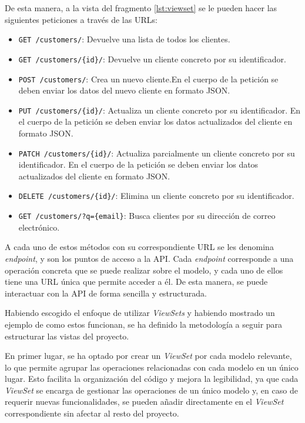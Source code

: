 De esta manera, a la vista del fragmento \ref{lst:viewset} se le pueden hacer las siguientes peticiones a través de las URLs:

\begin{itemize}
    \item \texttt{GET /customers/}: Devuelve una lista de todos los clientes.
    \item \texttt{GET /customers/\{id\}/}: Devuelve un cliente concreto por su identificador.
    \item \texttt{POST /customers/}: Crea un nuevo cliente.En el cuerpo de la petición se deben enviar los datos del nuevo cliente en formato JSON.
    \item \texttt{PUT /customers/\{id\}/}: Actualiza un cliente concreto por su identificador. En el cuerpo de la petición se deben enviar los datos actualizados del cliente en formato JSON.
    \item \texttt{PATCH /customers/\{id\}/}: Actualiza parcialmente un cliente concreto por su identificador. En el cuerpo de la petición se deben enviar los datos actualizados del cliente en formato JSON.
    \item \texttt{DELETE /customers/\{id\}/}: Elimina un cliente concreto por su identificador.
    \item \texttt{GET /customers/?q=\{email\}}: Busca clientes por su dirección de correo electrónico.
\end{itemize}

A cada uno de estos métodos con su correspondiente URL se les denomina \textit{endpoint}, y son los puntos de acceso a la API. Cada \textit{endpoint} corresponde a una operación concreta que se puede realizar sobre el modelo, y cada uno de ellos tiene una URL única que permite acceder a él. De esta manera, se puede interactuar con la API de forma sencilla y estructurada.

Habiendo escogido el enfoque de utilizar \textit{ViewSets} y habiendo mostrado un ejemplo de como estos funcionan, se ha definido la metodología a seguir para estructurar las vistas del proyecto.

En primer lugar, se ha optado por crear un \textit{ViewSet} por cada modelo relevante, lo que permite agrupar las operaciones relacionadas con cada modelo en un único lugar. Esto facilita la organización del código y mejora la legibilidad, ya que cada \textit{ViewSet} se encarga de gestionar las operaciones de un único modelo y, en caso de requerir nuevas funcionalidades, se pueden añadir directamente en el \textit{ViewSet} correspondiente sin afectar al resto del proyecto.

